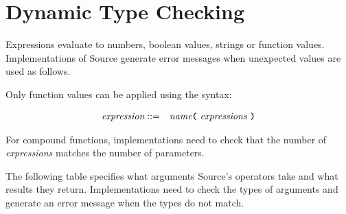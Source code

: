 
\section{Dynamic Type Checking}

Expressions evaluate to numbers, boolean values, strings or function values. Implementations
of Source generate error messages when unexpected values are used as follows.

Only function values can be applied using the syntax:

\begin{eqnarray*}
 \textit{expression}    
                                   & ::=   &  \textit{name}
                                               \texttt{\textbf{(}}\  \textit{expressions} \
                                               \texttt{\textbf{)}}\\ 
\end{eqnarray*}

For compound functions, implementations need to check that the number of \textit{expressions}
matches the number of parameters.

The following table specifies what arguments Source's operators
take and what results they return. Implementations need to check the types of arguments and
generate an error message when the types do not match.

